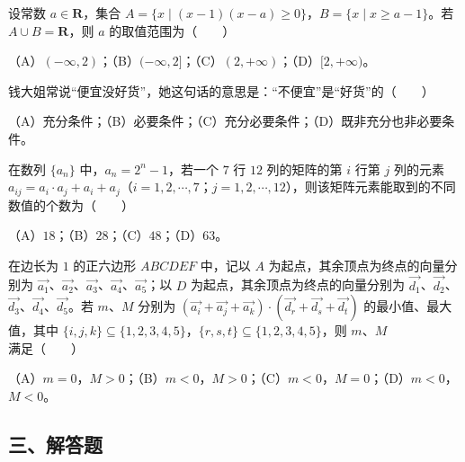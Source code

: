 \begin{question}
设常数 $a\in\mathbf R$，集合 $A=\{x\mid(x-1)(x-a)\geqslant0\}$，$B=\{x\mid x\geqslant a-1\}$。若 $A\cup B=\mathbf R$，则 $a$ 的取值范围为\mbox{（　　）}

（A）$(-\infty,2)$；（B）$(-\infty,2]$；（C）$(2,+\infty)$；（D）$[2,+\infty)$。

\end{question}
\begin{question}
钱大姐常说“便宜没好货”，她这句话的意思是：“不便宜”是“好货”的\mbox{（　　）}

（A）充分条件；（B）必要条件；（C）充分必要条件；（D）既非充分也非必要条件。

\end{question}
\begin{question}
在数列 $\{a_n\}$ 中，$a_n=2^n-1$，若一个 $7$ 行 $12$ 列的矩阵的第 $i$ 行第 $j$ 列的元素 $a_{ij}=a_i\cdot a_j+a_i+a_j$（$i=1,2,\cdots,7$；$j=1,2,\cdots,12$），则该矩阵元素能取到的不同数值的个数为\mbox{（　　）}

（A）$18$；（B）$28$；（C）$48$；（D）$63$。

\end{question}
\begin{question}
在边长为 $1$ 的正六边形 $ABCDEF$ 中，记以 $A$ 为起点，其余顶点为终点的向量分别为 $\overrightarrow{a_1}$、$\overrightarrow{a_2}$、$\overrightarrow{a_3}$、$\overrightarrow{a_4}$、$\overrightarrow{a_5}$；以 $D$ 为起点，其余顶点为终点的向量分别为 $\overrightarrow{d_1}$、$\overrightarrow{d_2}$、$\overrightarrow{d_3}$、$\overrightarrow{d_4}$、$\overrightarrow{d_5}$。若 $m$、$M$ 分别为 $(\overrightarrow{a_i}+\overrightarrow{a_j}+\overrightarrow{a_k})\cdot(\overrightarrow{d_r}+\overrightarrow{d_s}+\overrightarrow{d_t})$ 的最小值、最大值，其中 $\{i,j,k\}\subseteq\{1,2,3,4,5\}$，$\{r,s,t\}\subseteq\{1,2,3,4,5\}$，则 $m$、$M$ 满足\mbox{（　　）}

（A）$m=0$，$M>0$；（B）$m<0$，$M>0$；（C）$m<0$，$M=0$；（D）$m<0$，$M<0$。

\end{question}
\begingroup
\renewcommand{\gkpart}[1]{\Needspace{0.4\textheight}\subsection*{#1}\nopagebreak}
\gkpart{三、解答题}
\endgroup

